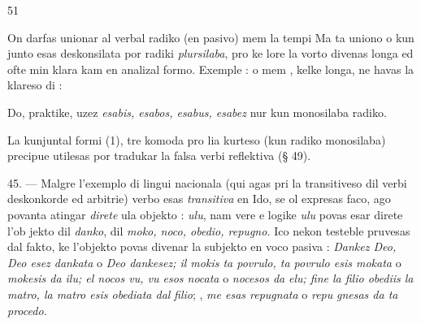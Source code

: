 \begin{VUpage}[55]{51}

On darfas unionar al verbal radiko (en pasivo) mem la\nl
tempi  Ma ta uniono o kun\cc
junto esas deskonsilata por radiki \textit{plursilaba}, pro ke lore la\nl
vorto divenas longa ed ofte min klara kam en analizal formo.\nl
Exemple :  o mem , kelke\nl
longa, ne havas la klareso di : \nl
{}

Do, praktike, uzez \textit{esabis, esabos, esabus, esabez} nur kun\nl
monosilaba radiko.

La kunjuntal formi (1), tre komoda pro lia kurteso (kun\nl
radiko monosilaba) precipue utilesas por tradukar la falsa\nl
verbi reflektiva (§ 49).

\VUblanc{5.62pt}%
45. --- Malgre l'exemplo di lingui nacionala (qui agas\nl
pri la transitiveso dil verbi deskonkorde ed arbitrie) verbo\nl
esas \textit{transitiva} en Ido, se ol expresas faco, ago povanta\nl
atingar \textit{direte} ula objekto : \nl
{} \textit{ulu}, nam vere e logike \textit{ulu} povas esar direte l'ob\cc
jekto dil \textit{danko}, dil \textit{moko, noco, obedio, repugno.} Ico nekon\cc
testeble pruvesas dal fakto, ke l'objekto povas divenar la\nl
subjekto en voco pasiva : \textit{Dankez Deo, Deo esez dankata} o\nl
\textit{Deo dankesez; il mokis ta povrulo, ta povrulo esis mokata}\nl
o \textit{mokesis da ilu; el nocos vu, vu esos nocata} o \textit{nocesos da}\nl
\textit{elu; fine la filio obediis la matro, la matro esis obediata dal}\nl
\textit{filio}; , \textit{me esas repugnata} o \textit{repu}\cc
\textit{gnesas da ta procedo.}


\end{VUpage}
